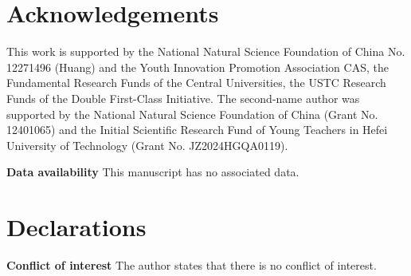 \documentclass[12pt, twoside]{article}
\theoremstyle{definition}
\numberwithin{equation}{section}
\begin{document}
  \section*{Acknowledgements}
This work is supported by the National Natural Science Foundation of China No. 12271496 (Huang) and the Youth Innovation Promotion Association CAS, the Fundamental Research Funds of the Central Universities, the USTC Research Funds of the Double First-Class Initiative. The second-name author was supported by the National Natural Science Foundation of China (Grant No. 12401065) and the Initial Scientific Research Fund of Young Teachers in Hefei University of Technology (Grant No. JZ2024HGQA0119). \medskip

\noindent\textbf{Data availability} {This manuscript has no associated data.}
\section*{Declarations}
\noindent\textbf{Conflict of interest} The author states that there is no conflict of interest.
\end{document}
